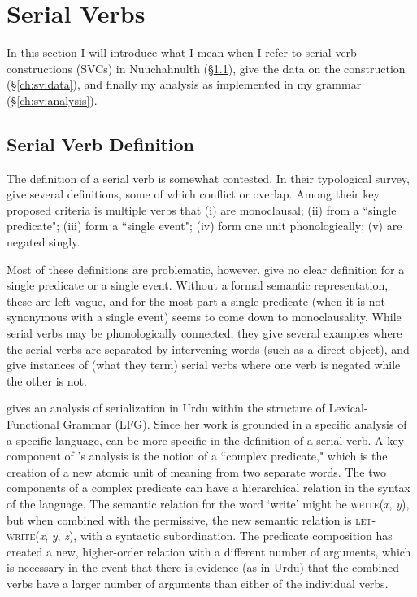 \chapter{Serial Verbs} \label{ch:sv}

In this section I will introduce what I mean when I refer to serial verb constructions (SVCs) in Nuuchahnulth (\S\ref{ch:sv:def}), give the data on the construction (\S\ref{ch:sv:data}), and finally my analysis as implemented in my grammar (\S\ref{ch:sv:analysis}).

\section{Serial Verb Definition} \label{ch:sv:def}

The definition of a serial verb is somewhat contested. In their typological survey, \cite{aikhenvalddixon2006} give several definitions, some of which conflict or overlap. Among their key proposed criteria is multiple verbs that (i) are monoclausal; (ii) from a ``single predicate"; (iii) form a ``single event"; (iv) form one unit phonologically; (v) are negated singly.

Most of these definitions are problematic, however. \citeauthor{aikhenvalddixon2006} give no clear definition for a single predicate or a single event. Without a formal semantic representation, these are left vague, and for the most part a single predicate (when it is not synonymous with a single event) seems to come down to monoclausality. While serial verbs may be phonologically connected, they give several examples where the serial verbs are separated by intervening words (such as a direct object), and give instances of (what they term) serial verbs where one verb is negated while the other is not.

\cite{butt1995} gives an analysis of serialization in Urdu within the structure of Lexical-Functional Grammar (LFG). Since her work is grounded in a specific analysis of a specific language, \citeauthor{butt1995} can be more specific in the definition of a serial verb. A key component of \citeauthor{butt1995}'s analysis is the notion of a ``complex predicate," which is the creation of a new atomic unit of meaning from two separate words. The two components of a complex predicate can have a hierarchical relation in the syntax of the language. The semantic relation for the word `write' might be \textsc{write}(\textit{x}, \textit{y}), but when combined with the permissive, the new semantic relation is \textsc{let-write}(\textit{x}, \textit{y}, \textit{z}), with a syntactic subordination. The predicate composition has created a new, higher-order relation with a different number of arguments, which is necessary in the event that there is evidence (as in Urdu) that the combined verbs have a larger number of arguments than either of the individual verbs.

